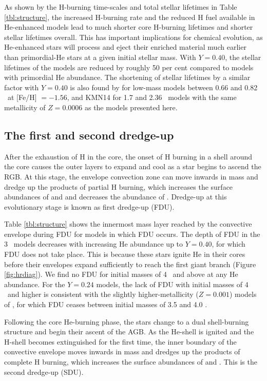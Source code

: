 As shown by the H-burning time-scales and total stellar lifetimes in Table \ref{tbl:structure}, the increased H-burning rate and the reduced H fuel available in He-enhanced models lead to much shorter core H-burning lifetimes and shorter stellar lifetimes overall. This has important implications for chemical evolution, as He-enhanced stars will process and eject their enriched material much earlier than primordial-He stars at a given initial stellar mass. With $Y=0.40$, the stellar lifetimes of the models are reduced by roughly 50 per cent compared to models with primordial He abundance. The shortening of stellar lifetimes by a similar factor with $Y=0.40$ is also found by \citet{Charbonnel:2013jt} for low-mass models between 0.66 and 0.82 \Msun\ at [Fe/H] $=-1.56$, and KMN14 for 1.7 and 2.36 \Msun\ models with the same metallicity of $Z=0.0006$ as the models presented here.

\subsection{The first and second dredge-up}
After the exhaustion of H in the core, the onset of H burning in a shell around the core causes the outer layers to expand and cool as a star begins to ascend the RGB. At this stage, the envelope convection zone can move inwards in mass and dredge up the products of partial H burning, which increases the surface abundances of  and  and decreases the abundance of . Dredge-up at this evolutionary stage is known as first dredge-up (FDU).

Table \ref{tbl:structure} shows the innermost mass layer reached by the convective envelope during FDU for models in which FDU occurs. The depth of FDU in the 3 \Msun\ models decreases with increasing He abundance up to $Y=0.40$, for which FDU does not take place. This is because these stars ignite He in their cores before their envelopes expand sufficiently to reach the first giant branch (Figure \ref{fig:hrdiag}). We find no FDU for initial masses of 4 \Msun\ and above at any He abundance. For the $Y=0.24$ models, the lack of FDU with initial masses of 4 \Msun\ and higher is consistent with the slightly higher-metallicity ($Z=0.001$) models of \citet{Fishlock:2014jq}, for which FDU ceases between initial masses of 3.5 and 4.0 \Msun.

Following the core He-burning phase, the stars change to a dual shell-burning structure and begin their ascent of the AGB. As the He-shell is ignited and the H-shell becomes extinguished for the first time, the inner boundary of the convective envelope moves inwards in mass and dredges up the products of complete H burning, which increases the surface abundances of  and . This is the second dredge-up (SDU).

